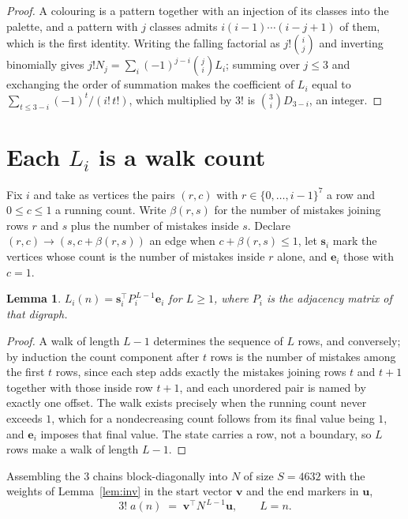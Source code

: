 \documentclass[11pt,a4paper]{article}
\theoremstyle{plain}
\newtheorem{lemma}[theorem]{Lemma}
\theoremstyle{definition}
\begin{document}
\begin{proof}
A colouring is a pattern together with an injection of its classes into the palette, and a
pattern with $j$ classes admits $i(i-1)\cdots(i-j+1)$ of them, which is the first identity.
Writing the falling factorial as $j!\binom{i}{j}$ and inverting binomially gives
$j!N_j=\sum_i(-1)^{j-i}\binom{j}{i}L_i$; summing over $j\le3$ and exchanging the order
of summation makes the coefficient of $L_i$ equal to $\sum_{t\le3-i}(-1)^t/(i!\,t!)$,
which multiplied by $3!$ is $\binom{3}{i}D_{3-i}$, an integer.
\end{proof}

\section{Each $L_i$ is a walk count}

Fix $i$ and take as vertices the pairs $(r,c)$ with $r\in\{0,\dots,i-1\}^{7}$ a row
and $0\le c\le1$ a running count. Write $\beta(r,s)$ for the number of mistakes joining
rows $r$ and $s$ plus the number of mistakes inside $s$. Declare $(r,c)\to(s,c+\beta(r,s))$
an edge when $c+\beta(r,s)\le1$, let $\mathbf{s}_i$ mark the vertices whose count is the
number of mistakes inside $r$ alone, and $\mathbf{e}_i$ those with $c=1$.

\begin{lemma}\label{lem:walk}
$L_i(n)=\mathbf{s}_i^{\!\top}P_i^{\,L-1}\mathbf{e}_i$ for $L\ge1$, where $P_i$ is the
adjacency matrix of that digraph.
\end{lemma}

\begin{proof}
A walk of length $L-1$ determines the sequence of $L$ rows, and conversely; by induction
the count component after $t$ rows is the number of mistakes among the first $t$ rows,
since each step adds exactly the mistakes joining rows $t$ and $t+1$ together with those
inside row $t+1$, and each unordered pair is named by exactly one offset. The walk exists
precisely when the running count never exceeds $1$, which for a nondecreasing count follows
from its final value being $1$, and $\mathbf{e}_i$ imposes that final value. The state
carries a row, not a boundary, so $L$ rows make a walk of length $L-1$.
\end{proof}

Assembling the $3$ chains block-diagonally into $N$ of size $S=4632$ with the weights of
Lemma~\ref{lem:inv} in the start vector $\mathbf{v}$ and the end markers in
$\mathbf{u}$,
\begin{equation}\label{eq:walk2}
3!\;a(n)\;=\;\mathbf{v}^{\!\top}N^{\,L-1}\mathbf{u},\qquad L=n .
\end{equation}
\end{document}
